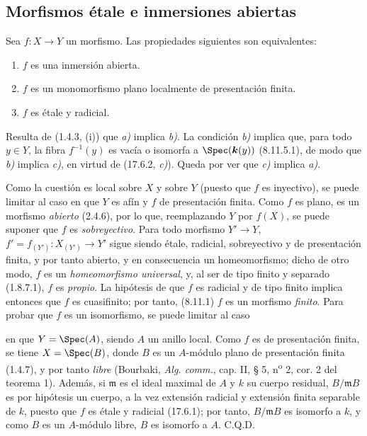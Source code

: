 \subsection{Morfismos étale e inmersiones abiertas}
\label{subsection:IV.17.9}
\label{IV.17.9}

\begin{theorem}[17.9.1]
\label{IV.17.9.1}
Sea $f:X\to Y$ un morfismo. Las propiedades siguientes son equivalentes:
\begin{enumerate}
  \item[\textup{a)}] $f$ es una inmersión abierta.
  \item[\textup{b)}] $f$ es un monomorfismo plano localmente de presentación finita.
  \item[\textup{c)}] $f$ es étale y radicial.
\end{enumerate}
\end{theorem}

Resulta de (1.4.3, (i)) que \emph{a)} implica \emph{b)}. La condición \emph{b)} implica que, para todo $y\in Y$, la fibra $f^{-1}(y)$ es vacía o isomorfa a $\Spec(\boldsymbol{k}(y))$ (8.11.5.1), de modo que \emph{b)} implica \emph{c)}, en virtud de (17.6.2, \emph{c)}). Queda por ver que \emph{c)} implica \emph{a)}.

Como la cuestión es local sobre $X$ y sobre $Y$ (puesto que $f$ es inyectivo), se puede limitar al caso en que $Y$ es afín y $f$ de presentación finita. Como $f$ es plano, es un morfismo \emph{abierto} (2.4.6), por lo que, reemplazando $Y$ por $f(X)$, se puede suponer que $f$ es \emph{sobreyectivo}. Para todo morfismo $Y'\to Y$, $f'=f_{(Y')}:X_{(Y')}\to Y'$ sigue siendo étale, radicial, sobreyectivo y de presentación finita, y por tanto abierto, y en consecuencia un homeomorfismo; dicho de otro modo, $f$ es un \emph{homeomorfismo universal}, y, al ser de tipo finito y separado (1.8.7.1), $f$ es \emph{propio}. La hipótesis de que $f$ es radicial y de tipo finito implica entonces que $f$ es cuasifinito; por tanto, (8.11.1) $f$ es un morfismo \emph{finito}. Para probar que $f$ es un isomorfismo, se puede limitar al caso


en que $Y=\Spec(A)$, siendo $A$ un anillo local. Como $f$ es de presentación finita, se tiene $X=\Spec(B)$, donde $B$ es un $A$-módulo plano de presentación finita (1.4.7), y por tanto \emph{libre} (Bourbaki, \emph{Alg. comm.}, cap. II, § 5, n\textsuperscript{o} 2, cor. 2 del teorema 1). Además, si $\mathfrak m$ es el ideal maximal de $A$ y $k$ su cuerpo residual, $B/\mathfrak mB$ es por hipótesis un cuerpo, a la vez extensión radicial y extensión finita separable de $k$, puesto que $f$ es étale y radicial (17.6.1); por tanto, $B/\mathfrak mB$ es isomorfo a $k$, y como $B$ es un $A$-módulo libre, $B$ es isomorfo a $A$. C.Q.D.

